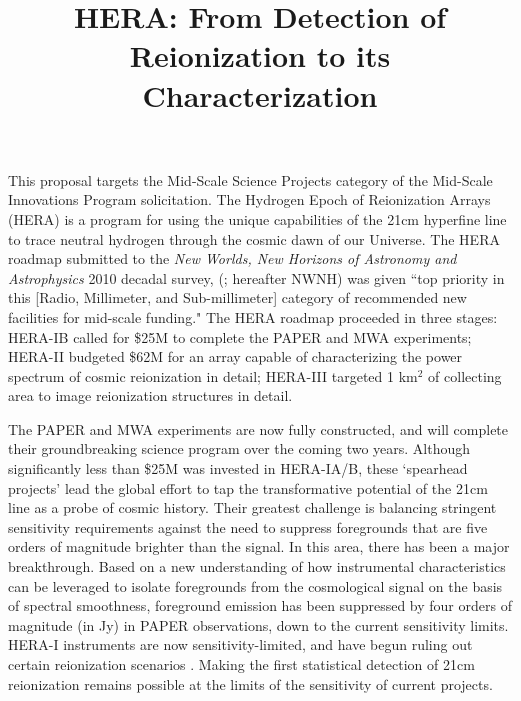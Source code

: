 \documentclass[preprint]{aastex}
\begin{document}
\title{HERA: From Detection of Reionization to its Characterization}

This proposal targets the Mid-Scale Science Projects category of the 
Mid-Scale Innovations Program solicitation.
The Hydrogen Epoch of Reionization Arrays (HERA) is a program for using the
unique capabilities of the 21cm hyperfine line to trace neutral hydrogen
through the cosmic dawn of our Universe.  The HERA roadmap submitted
to the {\it New Worlds, New Horizons of Astronomy and Astrophysics} 2010
decadal survey, (\citealt{astro2010}; hereafter NWNH) was given ``top priority in this [Radio,
Millimeter, and Sub-millimeter] category of recommended new facilities for
mid-scale funding." The HERA roadmap proceeded in three stages: HERA-IB called
for \$25M to complete the PAPER and MWA experiments; HERA-II budgeted \$62M for
an array capable of characterizing the power
spectrum of cosmic reionization in detail; HERA-III targeted 1 km$^2$ of
collecting area to image reionization structures in detail.

The PAPER and MWA experiments are now fully constructed, and will
complete their groundbreaking science program over the coming two years.
Although significantly less than \$25M was invested in HERA-IA/B, these
`spearhead projects' lead the global effort to tap the transformative
potential of the 21cm line as a probe of cosmic history.
Their greatest challenge is balancing stringent sensitivity requirements 
against the need to suppress
foregrounds that are five orders of magnitude brighter than the signal.   In
this area, there has been a major breakthrough.  Based on a new understanding
of how instrumental characteristics can be leveraged to isolate foregrounds
from the cosmological signal on the basis of spectral smoothness,
foreground emission has been suppressed by four orders of magnitude (in Jy) in PAPER
observations, down to the current sensitivity limits.
HERA-I instruments
are now sensitivity-limited, and have begun ruling out certain reionization scenarios
\citep{parsons_et_al2013}. Making the first statistical detection of 21cm
reionization remains possible at the limits of the sensitivity of current
projects.
\end{document}
